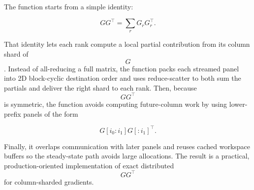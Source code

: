 \documentclass[11pt]{article}
\begin{document}
The function starts from a simple identity:

$$
GG^\top = \sum_r G_rG_r^\top.
$$

That identity lets each rank compute a local partial contribution from its column shard of $$G$$. Instead of all-reducing a full matrix, the function packs each streamed panel into 2D block-cyclic destination order and uses reduce-scatter to both sum the partials and deliver the right shard to each rank. Then, because $$GG^\top$$ is symmetric, the function avoids computing future-column work by using lower-prefix panels of the form

$$
G[i_0:i_1]G[:i_1]^\top.
$$

Finally, it overlaps communication with later panels and reuses cached workspace buffers so the steady-state path avoids large allocations. The result is a practical, production-oriented implementation of exact distributed $$GG^\top$$ for column-sharded gradients.
\end{document}
